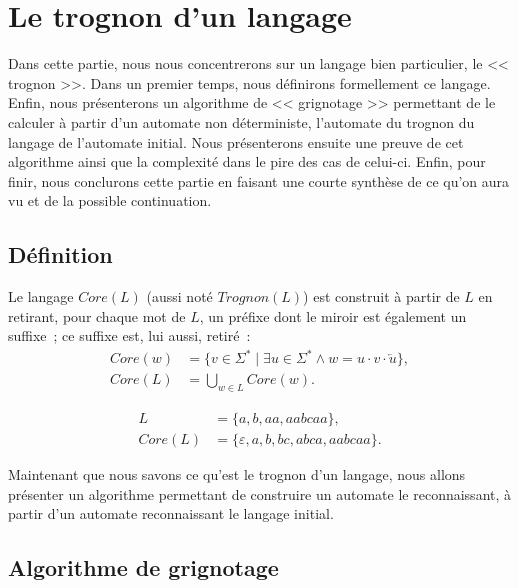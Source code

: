 \section{Le trognon d'un langage}

Dans cette partie, nous nous concentrerons sur un langage bien particulier, le
<< trognon >>. Dans un premier temps, nous définirons formellement ce langage.
Enfin, nous présenterons un algorithme de << grignotage >> permettant de le
calculer à partir d'un automate non déterministe, l'automate du trognon du
langage de l'automate initial. Nous présenterons ensuite une preuve de cet
algorithme ainsi que la complexité dans le pire des cas de celui-ci. Enfin,
pour finir, nous conclurons cette partie en faisant une courte synthèse de ce
qu'on aura vu et de la possible continuation.

\subsection{Définition}

\begin{definition}
  Le langage \(Core(L)\) (aussi noté \(Trognon(L)\)) est construit à partir de
  \(L\) en retirant, pour chaque mot de \(L\), un préfixe dont le miroir est
  également un suffixe~; ce suffixe est, lui aussi, retiré~:
  \begin{align*}
    Core(w) &= \{v \in \Sigma^* \mid \exists u \in \Sigma^* \land w = u \cdot v
    \cdot \overleftarrow{u}\}, \\
    Core(L) &= \bigcup_{w \in L} Core(w).
  \end{align*}
\end{definition}

\begin{example}
  \vspace{-\baselineskip}
  \begin{align*}
    L &= \{a, b, aa, aabcaa\}, \\
    Core(L) &= \{\varepsilon, a, b, bc, abca, aabcaa\}.
  \end{align*}
\end{example}

Maintenant que nous savons ce qu’est le trognon d’un langage, nous allons
présenter un algorithme permettant de construire un automate le reconnaissant,
à partir d’un automate reconnaissant le langage initial.

\subsection{Algorithme de grignotage}

